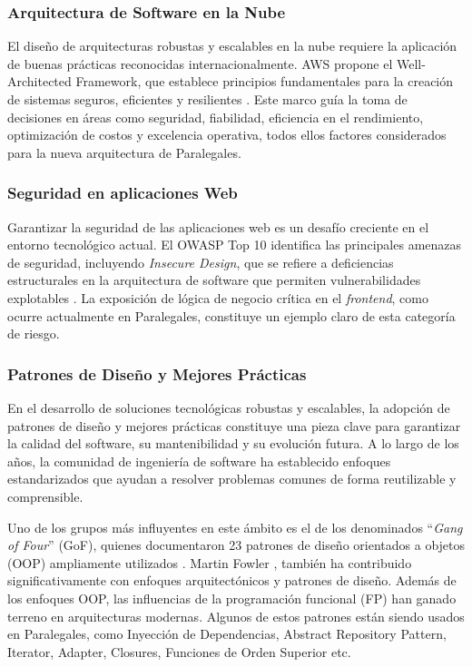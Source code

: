 \subsubsection{Arquitectura de Software en la Nube}

El diseño de arquitecturas robustas y escalables en la nube requiere la aplicación de buenas prácticas reconocidas internacionalmente. AWS propone el Well-Architected Framework, que establece principios fundamentales para la creación de sistemas seguros, eficientes y resilientes \cite{AWS2024}. Este marco guía la toma de decisiones en áreas como seguridad, fiabilidad, eficiencia en el rendimiento, optimización de costos y excelencia operativa, todos ellos factores considerados para la nueva arquitectura de Paralegales.

\subsubsection{Seguridad en aplicaciones Web}

Garantizar la seguridad de las aplicaciones web es un desafío creciente en el entorno tecnológico actual. El OWASP Top 10 identifica las principales amenazas de seguridad, incluyendo \textit{Insecure Design}, que se refiere a deficiencias estructurales en la arquitectura de software que permiten vulnerabilidades explotables \cite{OWASP2021}. La exposición de lógica de negocio crítica en el \textit{frontend}, como ocurre actualmente en Paralegales, constituye un ejemplo claro de esta categoría de riesgo.

\subsubsection{Patrones de Diseño y Mejores Prácticas}

En el desarrollo de soluciones tecnológicas robustas y escalables, la adopción de patrones de diseño y mejores prácticas constituye una pieza clave para garantizar la calidad del software, su mantenibilidad y su evolución futura. A lo largo de los años, la comunidad de ingeniería de software ha establecido enfoques estandarizados que ayudan a resolver problemas comunes de forma reutilizable y comprensible.

Uno de los grupos más influyentes en este ámbito es el de los denominados ``\textit{Gang of Four}'' (GoF), quienes documentaron 23 patrones de diseño orientados a objetos (OOP) ampliamente utilizados \cite{Gamma1994}. Martin Fowler \cite{Fowler2002}, también ha contribuido significativamente con enfoques arquitectónicos y patrones de diseño. Además de los enfoques OOP, las influencias de la programación funcional (FP) han ganado terreno en arquitecturas modernas. Algunos de estos patrones están siendo usados en Paralegales, como Inyección de Dependencias, Abstract Repository Pattern, Iterator, Adapter, Closures, Funciones de Orden Superior etc.

